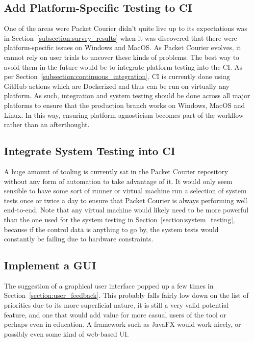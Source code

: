 \subsection{Add Platform-Specific Testing to CI}\label{subsection:add_platform_specific_testing_to_ci}

One of the areas were Packet Courier didn't quite live up to its expectations was in
Section~\ref{subsection:survey_results} when it was discovered that there were platform-specific issues on Windows
and MacOS. As Packet Courier evolves, it cannot rely on user trials to uncover these kinds of problems. The best way
to avoid them in the future would be to integrate platform testing into the CI. As per
Section~\ref{subsection:continuous_integration}, CI is currently done using GitHub actions which are
Dockerized\cite{dockerizing} and thus can be run on virtually any platform. As such, integration and system testing
should be done across all major platforms to ensure that the production branch works on Windows, MacOS and Linux. In
this way, ensuring platform agnosticism becomes part of the workflow rather than an afterthought.

\subsection{Integrate System Testing into CI}\label{subsection:integrate_system_testing_into_ci}

A huge amount of tooling is currently sat in the Packet Courier repository without any form of automation to take
advantage of it. It would only seem sensible to have some sort of runner or virtual machine run a selection of system
tests once or twice a day to ensure that Packet Courier is always performing well end-to-end. Note that any virtual
machine would likely need to be more powerful than the one used for the system testing in
Section~\ref{section:system_testing}, because if the control data is anything to go by, the system tests would
constantly be failing due to hardware constraints.

\subsection{Implement a GUI}\label{subsection:implement_gui}

The suggestion of a graphical user interface popped up a few times in Section~\ref{section:user_feedback}. This
probably falls fairly low down on the list of priorities due to its more superficial nature, it is still a very valid
potential feature, and one that would add value for more casual users of the tool or perhaps even in education. A
framework such as JavaFX\cite{java_fx} would work nicely, or possibly even some kind of web-based UI.

